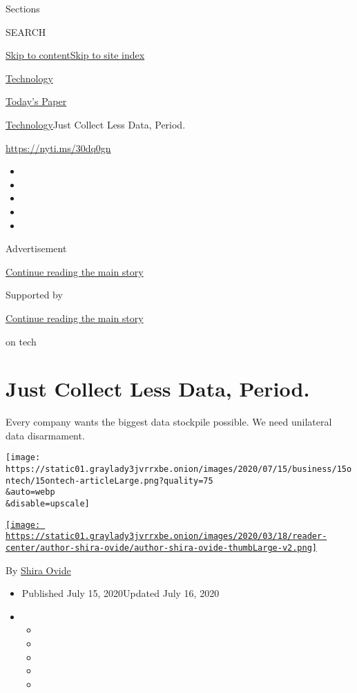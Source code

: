 Sections

SEARCH

\protect\hyperlink{site-content}{Skip to
content}\protect\hyperlink{site-index}{Skip to site index}

\href{https://www.nytimes3xbfgragh.onion/section/technology}{Technology}

\href{https://myaccount.nytimes3xbfgragh.onion/auth/login?response_type=cookie\&client_id=vi}{}

\href{https://www.nytimes3xbfgragh.onion/section/todayspaper}{Today's
Paper}

\href{/section/technology}{Technology}\textbar{}Just Collect Less Data,
Period.

\url{https://nyti.ms/30dq0gn}

\begin{itemize}
\item
\item
\item
\item
\item
\end{itemize}

Advertisement

\protect\hyperlink{after-top}{Continue reading the main story}

Supported by

\protect\hyperlink{after-sponsor}{Continue reading the main story}

on tech

\hypertarget{just-collect-less-data-period}{%
\section{Just Collect Less Data,
Period.}\label{just-collect-less-data-period}}

Every company wants the biggest data stockpile possible. We need
unilateral data disarmament.

\texttt{[image: https://static01.graylady3jvrrxbe.onion/images/2020/07/15/business/15ontech/15ontech-articleLarge.png?quality=75\\\&auto=webp\\\&disable=upscale]}

\href{https://www.nytimes3xbfgragh.onion/by/shira-ovide}{\texttt{[image: https://static01.graylady3jvrrxbe.onion/images/2020/03/18/reader-center/author-shira-ovide/author-shira-ovide-thumbLarge-v2.png]}}

By \href{https://www.nytimes3xbfgragh.onion/by/shira-ovide}{Shira Ovide}

\begin{itemize}
\item
  Published July 15, 2020Updated July 16, 2020
\item
  \begin{itemize}
  \item
  \item
  \item
  \item
  \item
  \end{itemize}
\end{itemize}

